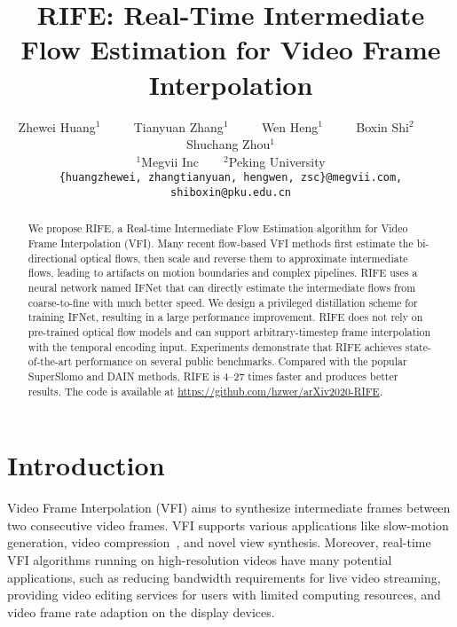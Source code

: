 \documentclass[final]{cvpr}
\begin{document}
    \title{RIFE: Real-Time Intermediate Flow Estimation for Video Frame Interpolation}

    \author{Zhewei Huang$^{1}$
		~~~~
		Tianyuan Zhang$^{1}$
		~~~~
		Wen Heng$^{1}$
		~~~~
		Boxin Shi$^{2}$
		~~~~
		Shuchang Zhou$^{1}$\\
		$^{1}$Megvii Inc~~~~$^{2}$Peking University\\
		{\tt\small \{huangzhewei, zhangtianyuan, hengwen, zsc\}@megvii.com, shiboxin@pku.edu.cn}
		}
\maketitle


\begin{abstract}
   We propose RIFE, a Real-time Intermediate Flow Estimation algorithm for Video Frame Interpolation (VFI). Many recent flow-based VFI methods first estimate the bi-directional optical flows, then scale and reverse them to approximate intermediate flows, leading to artifacts on motion boundaries and complex pipelines. RIFE uses a neural network named IFNet that can directly estimate the intermediate flows from coarse-to-fine with much better speed. We design a privileged distillation scheme for training IFNet, resulting in a large performance improvement. RIFE does not rely on pre-trained optical flow models and can support arbitrary-timestep frame interpolation with the temporal encoding input. Experiments demonstrate that RIFE achieves state-of-the-art performance on several public benchmarks. Compared with the popular SuperSlomo and DAIN methods, RIFE is 4--27 times faster and produces better results. The code is available at \url{https://github.com/hzwer/arXiv2020-RIFE}.
\end{abstract}

\section{Introduction}
Video Frame Interpolation (VFI) aims to synthesize intermediate frames between two consecutive video frames. VFI supports various applications like slow-motion generation, video compression~\cite{wu2018video}, and novel view synthesis. Moreover, real-time VFI algorithms running on high-resolution videos have many potential applications, such as reducing bandwidth requirements for live video streaming, providing video editing services for users with limited computing resources, and video frame rate adaption on the display devices.
\end{document}
